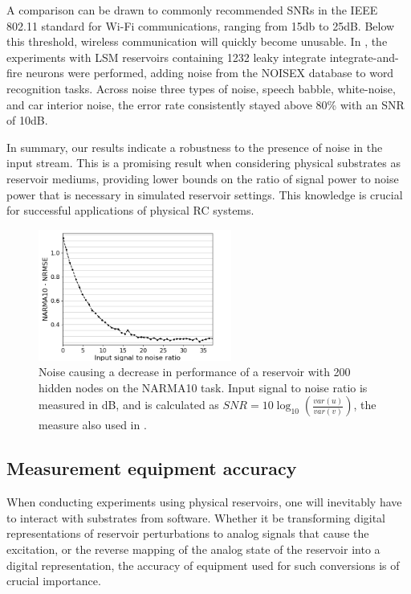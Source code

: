 A comparison can be drawn to commonly recommended SNRs in the IEEE 802.11
standard for Wi-Fi communications, ranging from 15db to 25dB. Below this
threshold, wireless communication will quickly become unusable. In
\cite{verstraeten_isolated_2005}, the experiments with LSM reservoirs containing
1232 leaky integrate integrate-and-fire neurons were performed, adding noise
from the NOISEX database to word recognition tasks. Across noise three types of
noise, speech babble, white-noise, and car interior noise, the error rate
consistently stayed above 80\% with an SNR of 10dB.

In summary, our results indicate a robustness to the presence of noise in the
input stream. This is a promising result when considering physical substrates as
reservoir mediums, providing lower bounds on the ratio of signal power to noise
power that is necessary in simulated reservoir settings. This knowledge is
crucial for successful applications of physical RC systems.

\begin{figure}[H]
  \centering
  \includegraphics[width=2.5in]{img/input_noise_snr.png}
  \caption{
    Noise causing a decrease in performance of a reservoir with 200 hidden nodes
on the NARMA10 task. Input signal to noise ratio is measured in dB, and is
calculated as $SNR = 10\log_{10}(\frac{var(u)}{var(v)})$, the measure also used
in \cite{dambre_information_2012}.
  }
  \label{input_noise_snr}
\end{figure}

\subsection{Measurement equipment accuracy}

When conducting experiments using physical reservoirs, one will inevitably have
to interact with substrates from software. Whether it be transforming digital
representations of reservoir perturbations to analog signals that cause the
excitation, or the reverse mapping of the analog state of the reservoir into a
digital representation, the accuracy of equipment used for such conversions is
of crucial importance.

